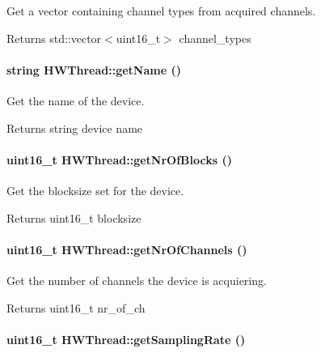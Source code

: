 Get a vector containing channel types from acquired channels. \begin{DoxyReturn}{Returns}
std::vector$<$uint16\_\-t$>$ channel\_\-types 
\end{DoxyReturn}
\hypertarget{class_h_w_thread_a052a0eb8639dda07c3b25df7066194fa}{
\paragraph[{getName}]{\setlength{\rightskip}{0pt plus 5cm}string HWThread::getName ()}\hfill}
\label{class_h_w_thread_a052a0eb8639dda07c3b25df7066194fa}


Get the name of the device. \begin{DoxyReturn}{Returns}
string device name 
\end{DoxyReturn}
\hypertarget{class_h_w_thread_a563ffea63c9ee8878f91a7b1f04eb58a}{
\paragraph[{getNrOfBlocks}]{\setlength{\rightskip}{0pt plus 5cm}uint16\_\-t HWThread::getNrOfBlocks ()}\hfill}
\label{class_h_w_thread_a563ffea63c9ee8878f91a7b1f04eb58a}


Get the blocksize set for the device. \begin{DoxyReturn}{Returns}
uint16\_\-t blocksize 
\end{DoxyReturn}
\hypertarget{class_h_w_thread_a18e32ba3ca6621edd899196113e1e213}{
\paragraph[{getNrOfChannels}]{\setlength{\rightskip}{0pt plus 5cm}uint16\_\-t HWThread::getNrOfChannels ()}\hfill}
\label{class_h_w_thread_a18e32ba3ca6621edd899196113e1e213}


Get the number of channels the device is acquiering. \begin{DoxyReturn}{Returns}
uint16\_\-t nr\_\-of\_\-ch 
\end{DoxyReturn}
\hypertarget{class_h_w_thread_acd129796e88e58d3ef2e157e5cbdd156}{
\paragraph[{getSamplingRate}]{\setlength{\rightskip}{0pt plus 5cm}uint16\_\-t HWThread::getSamplingRate ()}\hfill}
\label{class_h_w_thread_acd129796e88e58d3ef2e157e5cbdd156}


